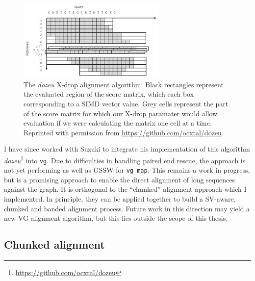 \begin{figure}[htbp!] 
\centering    
\includegraphics[width=0.65\textwidth]{Chapter2/Figs/xdrop.png}
\caption[The \emph{dozeu} X-drop alignment algorithm]{
  The \emph{dozeu} X-drop alignment algorithm.
  Black rectangles represent the evaluated region of the score matrix, which each box corresponding to a SIMD vector value.
  Grey cells represent the part of the score matrix for which our X-drop paramater would allow evaluation if we were calculating the matrix one cell at a time.
  Reprinted with permission from \url{https://github.com/ocxtal/dozeu}.
}
\label{fig:xdrop}
\end{figure}

I have since worked with Suzuki to integrate his implementation of this algorithm \emph{dozeu}\footnote{\url{https://github.com/ocxtal/dozeu}} into {\tt vg}.
Due to difficulties in handling paired end rescue, the approach is not yet performing as well as GSSW for {\tt vg map}.
This remains a work in progress, but is a promising approach to enable the direct alignment of long sequences against the graph.
It is orthogonal to the ``chunked'' alignment approach which I implemented.
In principle, they can be applied together to build a SV-aware, chunked and banded alignment process.
Future work in this direction may yield a new VG alignment algorithm, but this lies outside the scope of this thesis.

\subsection{Chunked alignment}
\label{sec:chunked_alignment}

